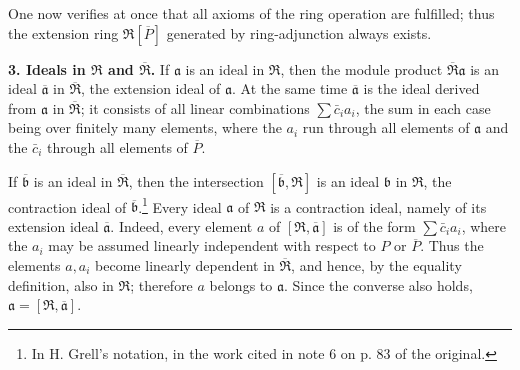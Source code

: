 \documentclass[11pt]{article}
\begin{document}
One now verifies at once that all axioms of the ring operation are fulfilled; thus the extension ring $\mathfrak R[\overline P]$ generated by ring-adjunction always exists.

\textbf{3. Ideals in $\mathfrak R$ and $\overline{\mathfrak R}$.} If $\mathfrak a$ is an ideal in $\mathfrak R$, then the module product $\overline{\mathfrak R}\mathfrak a$ is an ideal $\overline{\mathfrak a}$ in $\overline{\mathfrak R}$, the extension ideal of $\mathfrak a$. At the same time $\overline{\mathfrak a}$ is the ideal derived from $\mathfrak a$ in $\overline{\mathfrak R}$; it consists of all linear combinations $\sum \bar c_i a_i$, the sum in each case being over finitely many elements, where the $a_i$ run through all elements of $\mathfrak a$ and the $\bar c_i$ through all elements of $\overline P$.

If $\overline{\mathfrak b}$ is an ideal in $\overline{\mathfrak R}$, then the intersection $[\overline{\mathfrak b},\mathfrak R]$ is an ideal $\mathfrak b$ in $\mathfrak R$, the contraction ideal of $\overline{\mathfrak b}$.\footnote{In H. Grell's notation, in the work cited in note 6 on p. 83 of the original.} Every ideal $\mathfrak a$ of $\mathfrak R$ is a contraction ideal, namely of its extension ideal $\overline{\mathfrak a}$. Indeed, every element $a$ of $[\mathfrak R,\overline{\mathfrak a}]$ is of the form $\sum\bar c_i a_i$, where the $a_i$ may be assumed linearly independent with respect to $P$ or $\overline P$. Thus the elements $a,a_i$ become linearly dependent in $\overline{\mathfrak R}$, and hence, by the equality definition, also in $\mathfrak R$; therefore $a$ belongs to $\mathfrak a$. Since the converse also holds, $\mathfrak a=[\mathfrak R,\overline{\mathfrak a}]$.
\end{document}
